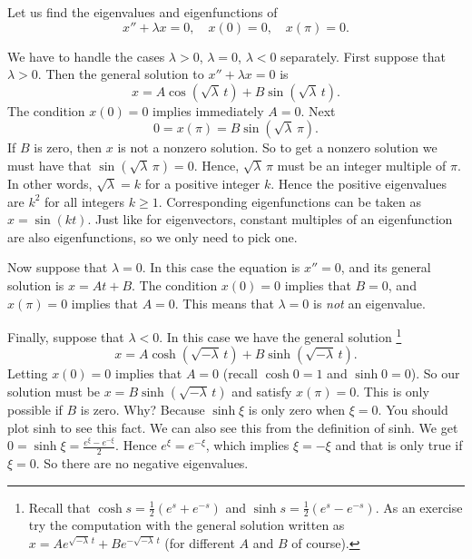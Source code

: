 \documentclass{ximera}
\begin{document}
\begin{example} \label{bvp:eig1ex}
    Let us find the eigenvalues and eigenfunctions of
    \begin{equation*}
        x'' + \lambda x = 0, \quad x(0) = 0, \quad x(\pi) = 0 .
    \end{equation*}
\end{example}

\begin{exampleSol}
    We have to handle the cases $\lambda > 0$, $\lambda = 0$, $\lambda < 0$ separately. First suppose that $\lambda > 0$.  Then the general solution to $x''+\lambda x = 0$ is
    \begin{equation*}
        x = A \cos ( \sqrt{\lambda}\, t) + B \sin ( \sqrt{\lambda}\, t).
    \end{equation*}
    The condition $x(0) = 0$ implies immediately $A = 0$. Next
    \begin{equation*}
        0 = x(\pi) = B \sin ( \sqrt{\lambda}\, \pi ) .
    \end{equation*}
    If $B$ is zero, then $x$ is not a nonzero solution.  So to get a nonzero solution we must have that $\sin ( \sqrt{\lambda}\, \pi) = 0$.  Hence, $\sqrt{\lambda}\, \pi$ must be an integer multiple of $\pi$.  In other words,  $\sqrt{\lambda} = k$ for a positive integer $k$. Hence the positive eigenvalues are $k^2$ for all integers $k \geq 1$.  Corresponding eigenfunctions can be taken as $x=\sin (k t)$.  Just like for eigenvectors, constant multiples of an eigenfunction are also eigenfunctions, so we only need to pick one.
    
    Now suppose that $\lambda = 0$.  In this case the equation is $x'' = 0$, and its general solution is $x = At + B$.  The condition $x(0) = 0$ implies that $B=0$, and $x(\pi) = 0$ implies that $A = 0$.  This means that $\lambda = 0$ is \emph{not} an eigenvalue.
    
    Finally, suppose that $\lambda < 0$.  In this case we have the general solution%
    \footnote{
        Recall that $\cosh s = \frac{1}{2}(e^s+e^{-s})$ and $\sinh s = \frac{1}{2}(e^s-e^{-s})$.  As an exercise try the computation with the general solution written as $x = A e^{\sqrt{-\lambda}\, t} + B e^{-\sqrt{-\lambda}\, t}$ (for different $A$ and $B$ of course).
        }
    \begin{equation*}
        x = A \cosh ( \sqrt{-\lambda}\, t) + B \sinh ( \sqrt{-\lambda}\, t ) .
    \end{equation*}
    Letting $x(0) = 0$ implies that $A = 0$ (recall $\cosh 0 = 1$ and $\sinh 0 = 0$).  So our solution must be $x = B \sinh ( \sqrt{-\lambda}\, t )$ and satisfy $x(\pi) = 0$.  This is only possible if $B$ is zero.  Why?  Because $\sinh \xi$ is only zero when $\xi=0$.  You should plot sinh to see this fact. We can also see this from the definition of sinh. We get $0 = \sinh \xi = \frac{e^\xi - e^{-\xi}}{2}$.  Hence $e^\xi = e^{-\xi}$, which implies $\xi = -\xi$ and that is only true if $\xi=0$.  So there are no negative eigenvalues.
    

\end{exampleSol}
\end{document}
